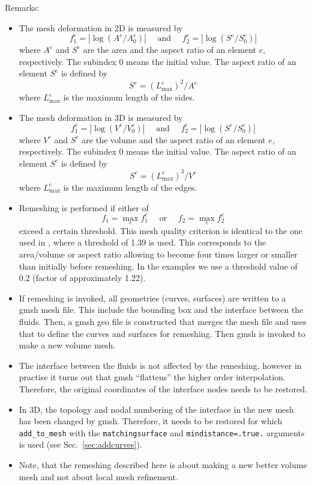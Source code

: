 Remarks:
\begin{itemize}
      \item The mesh deformation in 2D is measured by 
\[
   f^e_1 = |\log(A^e/A^e_0)| \quad\text{ and } \quad
   f^e_2 = |\log(S^e/S^e_0)|
\]
where $A^e$ and $S^e$ are the area and 
the aspect ratio of an element $e$, respectively.
The subindex 0 means the initial value.
The aspect ratio of an element $S^e$ is defined by
\[ 
   S^e=(L_\text{max}^e)^2/A^e
\]
where $L^e_\text{max}$ is the maximum length of the sides. 
   \item   The mesh deformation in 3D is measured by 
\[
   f^e_1 = |\log(V^e/V^e_0)| \quad\text{ and } \quad
   f^e_2 = |\log(S^e/S^e_0)|
\]
where $V^e$ and $S^e$ are the volume and 
the aspect ratio of an element $e$, respectively.
The subindex 0 means the initial value.
The aspect ratio of an element $S^e$ is defined by
\[ 
   S^e=(L_\text{max}^e)^3/V^e
\]
where $L^e_\text{max}$ is the maximum length of the edges. 
\item
Remeshing is performed if either of
\[
  f_1=\max_e f^e_1 \quad \text{ or } \quad 
  f_2=\max_e f^e_2 
\]
exceed a certain
threshold. This mesh quality criterion is identical to the one used
in \cite{Hu2001}, where a threshold of 1.39 is used. This corresponds to the
area/volume or aspect ratio allowing to become four times larger or smaller than
initially before remeshing. In the examples we use a
threshold value of 0.2 (factor of approximately 1.22).
\item If remeshing is invoked, all geometries (curves, surfaces) are written to a gmsh mesh file. This include the bounding box and the interface between the fluids. Then, a gmsh geo file is constructed that merges the mesh file and uses that to define the curves and surfaces for remeshing. Then gmsh is invoked to make a new volume mesh.
\item The interface between the fluids is not affected by the remeshing, however in practise it turns out that gmsh ``flattens'' the higher order interpolation. Therefore, the original coordinates of the interface nodes needs to be restored.
\item In 3D, the topology and nodal numbering of the interface in the new mesh has been changed by gmsh. Therefore, it needs to be restored for which \texttt{add\_to\_mesh} with the \texttt{matchingsurface} and \texttt{mindistance=.true.} arguments is used (see Sec.~\ref{sec:addcurves}).
\item Note, that the remeshing described here is about making a new better volume mesh and not about local mesh refinement.

\end{itemize}
